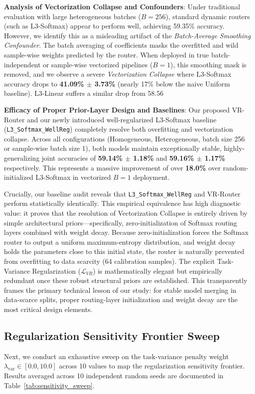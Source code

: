 \textbf{Analysis of Vectorization Collapse and Confounders}: Under traditional evaluation with large heterogeneous batches ($B=256$), standard dynamic routers (such as L3-Softmax) appear to perform well, achieving 59.35\% accuracy. However, we identify this as a misleading artifact of the \emph{Batch-Average Smoothing Confounder}. The batch averaging of coefficients masks the overfitted and wild sample-wise weights predicted by the router. When deployed in true batch-independent or sample-wise vectorized pipelines ($B=1$), this smoothing mask is removed, and we observe a severe \emph{Vectorization Collapse} where L3-Softmax accuracy drops to \textbf{41.09\% $\pm$ 3.73\%} (nearly 17\% below the naive Uniform baseline). L3-Linear suffers a similar drop from 58.56%

\textbf{Efficacy of Proper Prior-Layer Design and Baselines}: Our proposed VR-Router and our newly introduced well-regularized L3-Softmax baseline (\texttt{L3\_Softmax\_WellReg}) completely resolve both overfitting and vectorization collapse. Across all configurations (Homogeneous, Heterogeneous, batch size 256 or sample-wise batch size 1), both models maintain exceptionally stable, highly-generalizing joint accuracies of \textbf{59.14\% $\pm$ 1.18\%} and \textbf{59.16\% $\pm$ 1.17\%} respectively. This represents a massive improvement of over \textbf{18.0\%} over random-initialized L3-Softmax in vectorized $B=1$ deployment. 

Crucially, our baseline audit reveals that \texttt{L3\_Softmax\_WellReg} and VR-Router perform statistically identically. This empirical equivalence has high diagnostic value: it proves that the resolution of Vectorization Collapse is entirely driven by simple architectural priors---specifically, zero-initialization of Softmax routing layers combined with weight decay. Because zero-initialization forces the Softmax router to output a uniform maximum-entropy distribution, and weight decay holds the parameters close to this initial state, the router is naturally prevented from overfitting to data scarcity (64 calibration samples). The explicit Task-Variance Regularization ($\mathcal{L}_{VR}$) is mathematically elegant but empirically redundant once these robust structural priors are established. This transparently frames the primary technical lesson of our study: for stable model merging in data-scarce splits, proper routing-layer initialization and weight decay are the most critical design elements.

\subsection{Regularization Sensitivity Frontier Sweep}
Next, we conduct an exhaustive sweep on the task-variance penalty weight $\lambda_{\text{var}} \in [0.0, 10.0]$ across 10 values to map the regularization sensitivity frontier. Results averaged across 10 independent random seeds are documented in Table~\ref{tab:sensitivity_sweep}.

